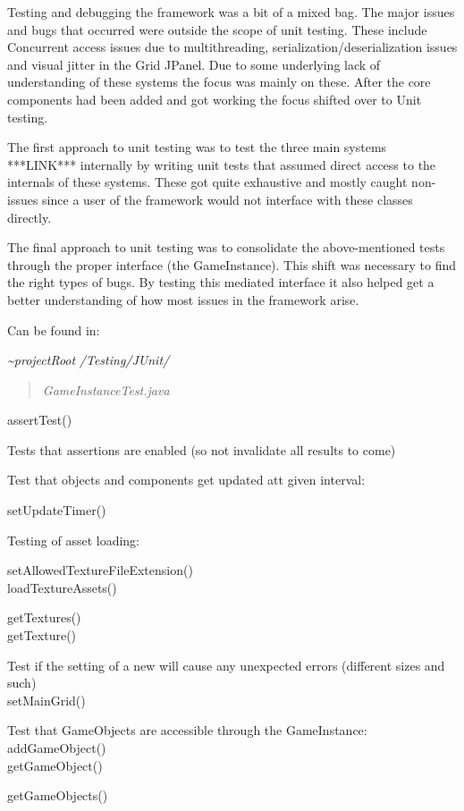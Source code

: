 \documentclass[]{article}
\date{}
\begin{document}
Testing and debugging the framework was a bit of a mixed bag. The major
issues and bugs that occurred were outside the scope of unit testing.
These include Concurrent access issues due to multithreading,
serialization/deserialization issues and visual jitter in the Grid
JPanel. Due to some underlying lack of understanding of these systems
the focus was mainly on these. After the core components had been added
and got working the focus shifted over to Unit testing.

The first approach to unit testing was to test the three main systems
***LINK*** internally by writing unit tests that assumed direct access
to the internals of these systems. These got quite exhaustive and mostly
caught non-issues since a user of the framework would not interface with
these classes directly.

The final approach to unit testing was to consolidate the
above-mentioned tests through the proper interface (the GameInstance).
This shift was necessary to find the right types of bugs. By testing
this mediated interface it also helped get a better understanding of how
most issues in the framework arise.

Can be found in:

\emph{\textasciitilde{}projectRoot} \emph{/Testing/JUnit/ }

\begin{quote}
\emph{GameInstanceTest.java}
\end{quote}

assertTest()

Tests that assertions are enabled (so not invalidate all results to
come)

Test that objects and components get updated att given interval:

setUpdateTimer()

Testing of asset loading:

setAllowedTextureFileExtension()\\
loadTextureAssets()

getTextures()\\
getTexture()

Test if the setting of a new will cause any unexpected errors (different
sizes and such)\\
setMainGrid()

Test that GameObjects are accessible through the GameInstance:\\
addGameObject()\\
getGameObject()

getGameObjects()
\end{document}
